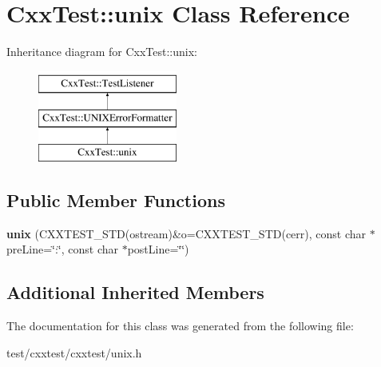 \hypertarget{classCxxTest_1_1unix}{\section{Cxx\-Test\-:\-:unix Class Reference}
\label{classCxxTest_1_1unix}
}
Inheritance diagram for Cxx\-Test\-:\-:unix\-:\begin{figure}[H]
\begin{center}
\leavevmode
\includegraphics[height=3.000000cm]{classCxxTest_1_1unix}
\end{center}
\end{figure}
\subsection*{Public Member Functions}
\begin{DoxyCompactItemize}
\item 
\hypertarget{classCxxTest_1_1unix_a1356e55621e69887cc0e03d5d8163941}{{\bfseries unix} (C\-X\-X\-T\-E\-S\-T\-\_\-\-S\-T\-D(ostream)\&o=C\-X\-X\-T\-E\-S\-T\-\_\-\-S\-T\-D(cerr), const char $\ast$pre\-Line=\char`\"{}\-:\char`\"{}, const char $\ast$post\-Line=\char`\"{}\char`\"{})}\label{classCxxTest_1_1unix_a1356e55621e69887cc0e03d5d8163941}

\end{DoxyCompactItemize}
\subsection*{Additional Inherited Members}


The documentation for this class was generated from the following file\-:\begin{DoxyCompactItemize}
\item 
test/cxxtest/cxxtest/unix.\-h\end{DoxyCompactItemize}
